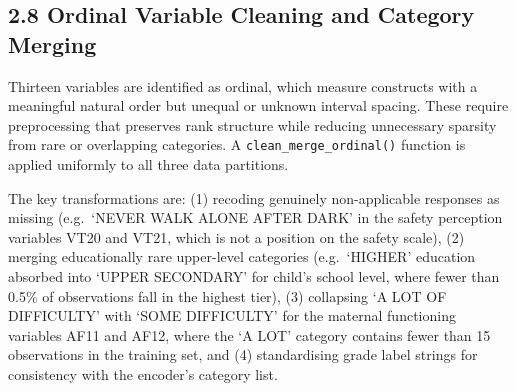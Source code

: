 \documentclass[11pt]{article}
\begin{document}
    \hypertarget{ordinal-variable-cleaning-and-category-merging}{%
\subsection{2.8 Ordinal Variable Cleaning and Category
Merging}\label{ordinal-variable-cleaning-and-category-merging}}

Thirteen variables are identified as ordinal, which measure constructs
with a meaningful natural order but unequal or unknown interval spacing.
These require preprocessing that preserves rank structure while reducing
unnecessary sparsity from rare or overlapping categories. A
\texttt{clean\_merge\_ordinal()} function is applied uniformly to all
three data partitions.

The key transformations are: (1) recoding genuinely non-applicable
responses as missing (e.g.~`NEVER WALK ALONE AFTER DARK' in the safety
perception variables VT20 and VT21, which is not a position on the
safety scale), (2) merging educationally rare upper-level categories
(e.g.~`HIGHER' education absorbed into `UPPER SECONDARY' for child's
school level, where fewer than 0.5\% of observations fall in the highest
tier), (3) collapsing `A LOT OF DIFFICULTY' with `SOME DIFFICULTY' for
the maternal functioning variables AF11 and AF12, where the `A LOT'
category contains fewer than 15 observations in the training set, and
(4) standardising grade label strings for consistency with the encoder's
category list.
\end{document}
